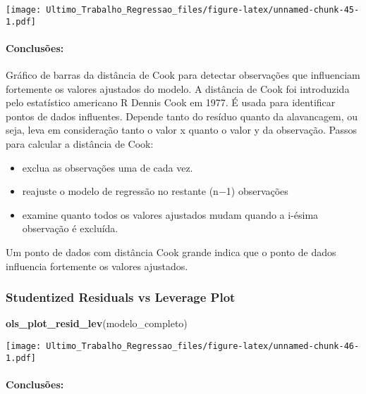 \documentclass[
]{article}
\newenvironment{Shaded}{\begin{snugshade}}{\end{snugshade}}
\newcommand{\FunctionTok}[1]{\textcolor[rgb]{0.13,0.29,0.53}{\textbf{#1}}}
\newcommand{\NormalTok}[1]{#1}
\providecommand{\tightlist}{%
  \setlength{\itemsep}{0pt}\setlength{\parskip}{0pt}}
\begin{document}
\texttt{[image: Ultimo\_Trabalho\_Regressao\_files/figure-latex/unnamed-chunk-45-1.pdf]}

\hypertarget{conclusuxf5es-7}{%
\paragraph{Conclusões:}\label{conclusuxf5es-7}}

Gráfico de barras da distância de Cook para detectar observações que
influenciam fortemente os valores ajustados do modelo. A distância de
Cook foi introduzida pelo estatístico americano R Dennis Cook em 1977. É
usada para identificar pontos de dados influentes. Depende tanto do
resíduo quanto da alavancagem, ou seja, leva em consideração tanto o
valor x quanto o valor y da observação. Passos para calcular a distância
de Cook:

\begin{itemize}
\tightlist
\item
  exclua as observações uma de cada vez.
\item
  reajuste o modelo de regressão no restante (n−1) observações
\item
  examine quanto todos os valores ajustados mudam quando a i-ésima
  observação é excluída.
\end{itemize}

Um ponto de dados com distância Cook grande indica que o ponto de dados
influencia fortemente os valores ajustados.

\hypertarget{studentized-residuals-vs-leverage-plot}{%
\subsubsection{Studentized Residuals vs Leverage
Plot}\label{studentized-residuals-vs-leverage-plot}}

\begin{Shaded}
\begin{Highlighting}[]
\FunctionTok{ols\_plot\_resid\_lev}\NormalTok{(modelo\_completo)}
\end{Highlighting}
\end{Shaded}

\texttt{[image: Ultimo\_Trabalho\_Regressao\_files/figure-latex/unnamed-chunk-46-1.pdf]}

\hypertarget{conclusuxf5es-8}{%
\paragraph{Conclusões:}\label{conclusuxf5es-8}}
\end{document}
